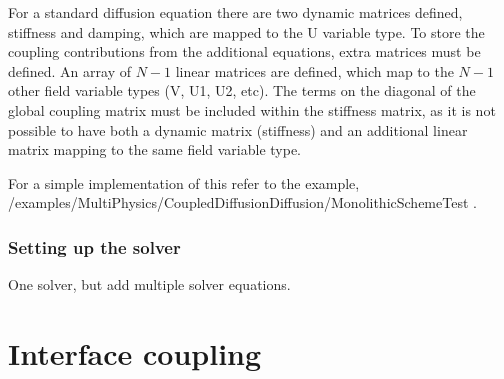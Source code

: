 For a standard diffusion equation there are two dynamic matrices defined, stiffness and damping, which are mapped to the U variable type. To store the coupling contributions from the additional equations, extra matrices must be defined. An array of $N-1$ linear matrices are defined, which map to the $N-1$ other field variable types (V, U1, U2, etc). The terms on the diagonal of the global coupling matrix must be included within the stiffness matrix, as it is not possible to have both a dynamic matrix (stiffness) and an additional linear matrix mapping to the same field variable type. 

For a simple implementation of this refer to the example, /examples/MultiPhysics/CoupledDiffusionDiffusion/MonolithicSchemeTest .

\subsubsection{Setting up the solver}

One solver, but add multiple solver equations.

\section{Interface coupling}